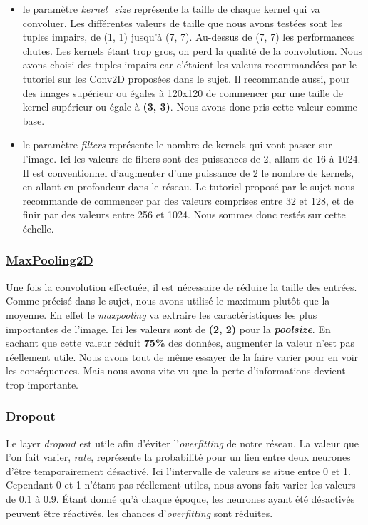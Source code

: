 \documentclass{rapport}
\begin{document}
            \begin{itemize}
                \item le paramètre \textit{kernel\_size} représente la taille de chaque kernel qui va convoluer. Les différentes valeurs de taille que nous avons testées sont les tuples impairs, de (1, 1) jusqu'à (7, 7). Au-dessus de (7, 7) les performances chutes. Les kernels étant trop gros, on perd la qualité de la convolution. Nous avons choisi des tuples impairs car c'étaient les valeurs recommandées par le tutoriel\cite{convdLayer} sur les Conv2D proposées dans le sujet. Il recommande aussi, pour des images supérieur ou égales à 120x120 de commencer par une taille de kernel supérieur ou égale à \textbf{(3, 3)}. Nous avons donc pris cette valeur comme base.
                
                \item le paramètre \textit{filters} représente le nombre de kernels qui vont passer sur l'image. Ici les valeurs de filters sont des puissances de 2, allant de 16 à 1024. Il est conventionnel d'augmenter d'une puissance de 2 le nombre de kernels, en allant en profondeur dans le réseau. Le tutoriel\cite{convdLayer} proposé par le sujet nous recommande de commencer par des valeurs comprises entre 32 et 128, et de finir par des valeurs entre 256 et 1024. Nous sommes donc restés sur cette échelle.

            \end{itemize}
        
            \subsubsection{\href{https://keras.io/api/layers/pooling_layers/max_pooling2d/}{MaxPooling2D}}
            Une fois la convolution effectuée, il est nécessaire de réduire la taille des entrées. Comme précisé dans le sujet, nous avons utilisé le maximum plutôt que la moyenne. En effet le \textit{maxpooling} va extraire les caractéristiques les plus importantes de l'image. Ici les valeurs sont de \textbf{(2, 2)} pour la \textit{\textbf{poolsize}}. En sachant que cette valeur réduit \textbf{75\%} des données, augmenter la valeur n'est pas réellement utile. Nous avons tout de même essayer de la faire varier pour en voir les conséquences. Mais nous avons vite vu que la perte d'informations devient trop importante.
            
            \subsubsection{\href{https://keras.io/api/layers/regularization_layers/dropout/}{Dropout}}
            Le layer \textit{\textit{dropout}} est utile afin d'éviter l'\textit{overfitting} de notre réseau. La valeur que l'on fait varier, \textit{rate}, représente la probabilité pour un lien entre deux neurones d'être temporairement désactivé. Ici l'intervalle de valeurs se situe entre 0 et 1. Cependant 0 et 1 n'étant pas réellement utiles, nous avons fait varier les valeurs de 0.1 à 0.9. Étant donné qu'à chaque époque, les neurones ayant été désactivés peuvent être réactivés, les chances d'\textit{overfitting} sont réduites.
        
\end{document}
